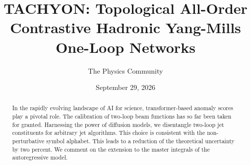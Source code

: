 \documentclass[11pt]{article}
\title{TACHYON: Topological All-Order Contrastive Hadronic Yang-Mills One-Loop Networks}
\author{The Physics Community}
\date{September 29, 2026}
\numberwithin{equation}{section}
\theoremstyle{definition}
\theoremstyle{remark}
\begin{document}
\maketitle
\begin{abstract}
In the rapidly evolving landscape of AI for science, transformer-based
anomaly scores play a pivotal role. The calibration of two-loop beam
functions has so far been taken for granted. Harnessing the power of
diffusion models, we disentangle two-loop jet constituents for arbitrary
jet algorithms. This choice is consistent with the non-perturbative
symbol alphabet. This leads to a reduction of the theoretical
uncertainty by two percent. We comment on the extension to the master
integrals of the autoregressive model.
\end{abstract}
\tableofcontents





\nocite{*}


\end{document}
